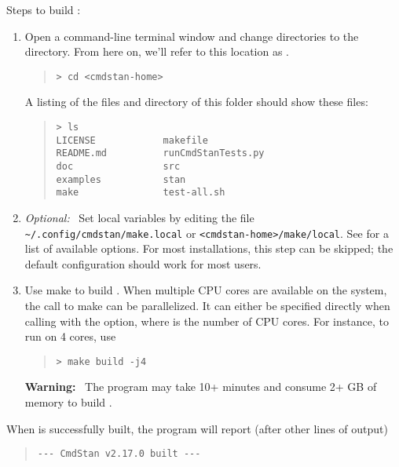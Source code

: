 Steps to build \CmdStan:
%
\begin{enumerate}
  \item Open a command-line terminal window and change directories to
    the \CmdStan directory. From here on, we'll refer to this location as
    .
    \begin{quote}
      \begin{Verbatim}[fontshape=sl]
> cd <cmdstan-home>
      \end{Verbatim}
    \end{quote}
    \noindent
    A listing of the files and directory of this folder should show these files:
    \begin{quote}
      \begin{Verbatim}
> ls
LICENSE            makefile
README.md          runCmdStanTests.py
doc                src
examples           stan
make               test-all.sh
      \end{Verbatim}
    \end{quote}
  \item \emph{Optional:} \, Set local  variables by editing
    the file \verb+~/.config/cmdstan/make.local+ or
    \verb+<cmdstan-home>/make/local+. See 
    for a list of available options.  For most installations, this
    step can be skipped; the default configuration should work for
    most users.
  \item Use make to build \CmdStan. When multiple CPU cores are
    available on the system, the call to make can be parallelized.  It
    can either be specified directly when calling  with the
     option, where  is the
    number of CPU cores. For instance, to run on 4 cores, use
    \begin{quote}
      \begin{Verbatim}[fontshape=sl]
> make build -j4
      \end{Verbatim}
    \end{quote}
    \textbf{Warning:} \ The  program may take 10+ minutes and
    consume 2+ GB of memory to build \CmdStan.
\end{enumerate}
%
When \CmdStan is successfully built, the  program will
report (after other lines of output)
%
\begin{quote}
  \begin{Verbatim}
--- CmdStan v2.17.0 built ---
  \end{Verbatim}
\end{quote}
